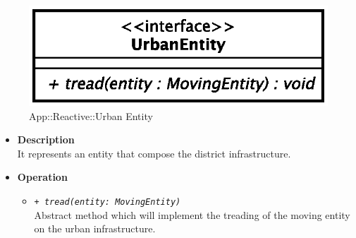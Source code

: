 \begin{figure}[h]
\centering
\includegraphics[scale=0.6,keepaspectratio]{images/solution/urban_entity.eps}
\caption{App::Reactive::Urban Entity}
\label{fig:sd-app-urban-entity}
\end{figure}
\FloatBarrier
\begin{itemize}
  \item \textbf{Description} \\
    It represents an entity that compose the district infrastructure.
  \item \textbf{Operation}
  \begin{itemize} 
    \item \texttt{\textit{+ tread(entity: MovingEntity)}} \\
Abstract method which will implement the treading of the moving entity 
on the urban infrastructure.
  \end{itemize}
\end{itemize}

